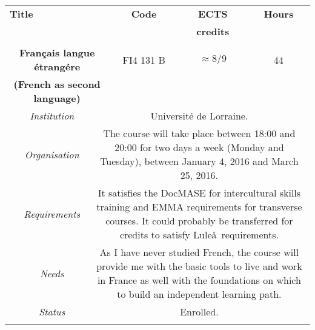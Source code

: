 \begin{table}
\centering
\scriptsize
\begin{tabularx}{\textwidth}{cccccc}
\toprule
\midrule
  \multicolumn{3}{l}{\textbf{Title}}&\textbf{Code} &\textbf{ECTS}&\textbf{Hours} \\
   &&&& \textbf{credits}&\\
    \midrule
    &&&&&\\
    \multicolumn{3}{p{0.5\textwidth}}{\textbf{Français langue \'etrang\'ere}}&FI4 131 B&$\approx8/9$&44\\
   \multicolumn{3}{p{0.5\textwidth}}{\textbf{(French as second language)}}&&&\\
   \midrule
   &\textit{Institution}&\multicolumn{4}{p{0.7\textwidth}}{Universit\'e de Lorraine.}\\
   &\textit{Organisation}&\multicolumn{4}{p{0.7\textwidth}}{The course will take place between 18:00 and 20:00 for two days a week (Monday and Tuesday), between January 4, 2016 and March 25, 2016.}\\
   &\textit{Requirements}&\multicolumn{4}{p{0.7\textwidth}}{It satisfies the DocMASE for intercultural skills training and EMMA requirements for transverse courses. It could probably be transferred for credits to satisfy Lule\aa\ requirements.}\\
   &\textit{Needs}&\multicolumn{4}{p{0.7\textwidth}}{As I have never studied French, the course will provide me with the basic tools to live and work in France as well with the foundations on which to build an independent learning path.}\\
   &\textit{Status}&\multicolumn{4}{p{0.7\textwidth}}{Enrolled.}\\
   \midrule
    \bottomrule
\label{tab:proposal_tab2} 
\end{tabularx}
\end{table}